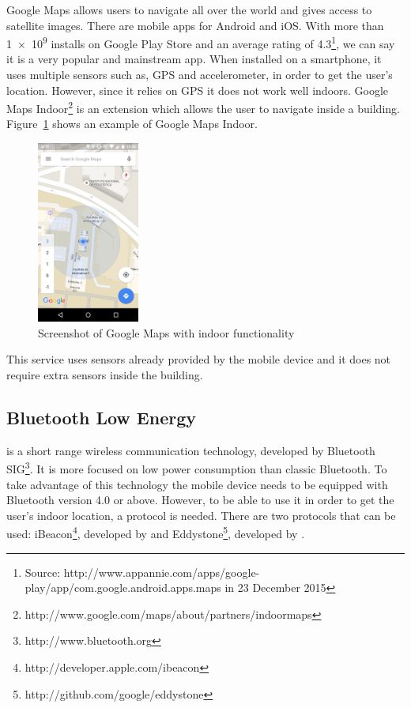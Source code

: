 Google Maps allows users to navigate all over the world and gives access to satellite images.
There are mobile apps for Android and iOS.
With more than \num{1e9} installs on Google Play Store and an average rating of 4.3\footnote{Source: http://www.appannie.com/apps/google-play/app/com.google.android.apps.maps in 23 December 2015}, we can say it is a very popular and mainstream app.
When installed on a smartphone, it uses multiple sensors such as, \gls{GPS} and accelerometer, in order to get the user's location.
However, since it relies on \gls{GPS} it does not work well indoors.
Google Maps Indoor\footnote{http://www.google.com/maps/about/partners/indoormaps} is an extension which allows the user to navigate inside a building.
Figure~\ref{fig:google_maps_indoor} shows an example of Google Maps Indoor.

\begin{figure}[!ht]
  \centering
    \includegraphics[width=0.3\textwidth, keepaspectratio]{images/screenshots/google_maps_indoor}
    \caption[Google Maps Indoor]{Screenshot of Google Maps with indoor functionality}
    \label{fig:google_maps_indoor}
\end{figure}

This service uses sensors already provided by the mobile device and it does not require extra sensors inside the building.

\subsection{Bluetooth Low Energy}
\label{sub:background_bluetooth_low_energy}
\cite{ble} is a short range wireless communication technology, developed by Bluetooth \gls{SIG}\footnote{http://www.bluetooth.org}.
It is more focused on low power consumption than classic Bluetooth.
To take advantage of this technology the mobile device needs to be equipped with Bluetooth version 4.0\cite{bluetooth_specification} or above.
However, to be able to use it in order to get the user's indoor location, a protocol is needed.
There are two protocols that can be used: iBeacon\footnote{http://developer.apple.com/ibeacon}, developed by  and Eddystone\footnote{http://github.com/google/eddystone}, developed by .

